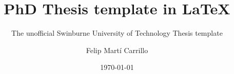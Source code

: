 \documentclass{class/fsetswin-phd}
\author{
	Felip Mart\'{i} Carrillo 
}
\title{PhD Thesis template in LaTeX}
\subtitle{The unofficial Swinburne University of Technology Thesis template}
\date{\mydate\today}
\begin{document}
    \makefrontmatter


    \cleardoublepage


    \ifdefined\isdraft
        \doublespacing
    \else
        \onehalfspacing
    \fi

    

    

    




    
    \begin{appendices}

        

        


    \end{appendices}
\end{document}
